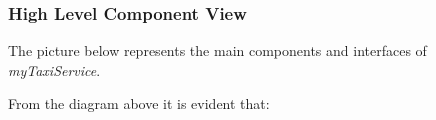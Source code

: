 \documentclass[a4paper,11pt]{report} %
\newcommand{\mts}{\mbox{\normalfont\itshape myTaxiService}}
\begin{document}
	\subsubsection{High Level Component View}
	The picture below represents the main components and interfaces of \mts{}.\\
	\begin{minipage}{\linewidth}
	\end{minipage}		
	From the diagram above it is evident that:
\end{document}
